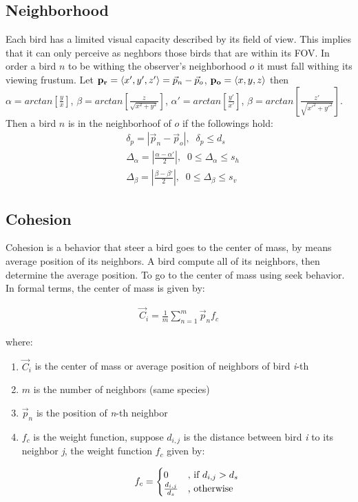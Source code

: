 \documentclass[journal,transmag]{IEEEtran}
\begin{document}
\subsection{Neighborhood}
Each bird has a limited visual capacity described by its field of view. This
implies that it can only perceive as neghbors those birds that are within its
FOV. In order a bird  $n$ to be withing the  observer's neighborhood $o$ it must
fall withing its viewing frustum. Let $\vb{p_r}=\expval{x',y',z'} = \vec{p}_{n}
- \vec{p}_{o}$, $\vb{p_o}=\expval{x,y,z}$ then $\alpha = arctan
\left[\frac{y}{x}\right]$, $\beta = arctan \left[\frac{z}{\sqrt{x^2 +
y^2}}\right]$, $\alpha' = arctan\left[\frac{y'}{x'}\right]$, $\beta = arctan
\left[\frac{z'}{\sqrt{x'^2 + y'^2}}\right]$. Then a bird $n$ is in the
neighborhoof of $o$ if the followings hold:
\begin{align}
&\delta_p = |\vec{p}_{n} - \vec{p}_{o}|,\;\; \delta_p \leq d_s\\
&\Delta_\alpha = \left|\frac{\alpha - \alpha'}{2}\right|,\;\; 0 \leq \Delta_\alpha \leq s_h\\
&\Delta_\beta = \left|\frac{\beta - \beta'}{2}\right|,\;\; 0 \leq \Delta_\beta \leq s_v
\end{align}



\subsection{Cohesion}
Cohesion is a behavior that steer a bird goes to the center of mass, by means average position of its neighbors. A bird compute all of its neighbors, then determine the average position. To go to the center of mass using seek behavior. In formal terms, the center of mass is given by:

\begin{align}
\vec{C}_i = \frac{1}{m}\sum_{n=1}^m{\vec{p}_n f_c}
\end{align}

where:

\begin{enumerate}
\item \(\vec{C}_i\) is the center of mass or average position of neighbors of bird \emph{i}-th
\item \(m\) is the number of neighbors (same species)
\item \(\vec{p}_n\) is the position of \emph{n}-th neighbor
\item \(f_c\) is the weight function, suppose \(d_{i,j}\) is the distance between bird \emph{i} to its neighbor \emph{j}, the weight function \(f_c\) given by:

\begin{equation*}
	f_c = \begin{cases}
	0 &\text{, if $ d_{i,j} > d_s$}\\
	\frac{d_{i,j}}{d_s} &\text{, otherwise}
	\end{cases}
\end{equation*}

\end{enumerate}
\end{document}
